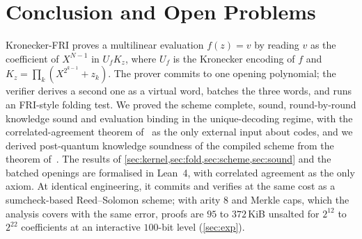 \section{Conclusion and Open Problems}\label{sec:concl}

Kronecker-FRI proves a multilinear evaluation $f(z) = v$ by reading $v$ as the coefficient of $X^{N-1}$ in $U_f K_z$, where $U_f$ is the Kronecker encoding of $f$ and $K_z = \prod_k (X^{2^{k-1}} + z_k)$.
The prover commits to one opening polynomial; the verifier derives a second one as a virtual word, batches the three words, and runs an FRI-style folding test.
We proved the scheme complete, sound, round-by-round knowledge sound and evaluation binding in the unique-decoding regime, with the correlated-agreement theorem of~\cite{BCIKS23} as the only external input about codes, and we derived post-quantum knowledge soundness of the compiled scheme from the theorem of~\cite{CDHZ25}. The results of \cref{sec:kernel,sec:fold,sec:scheme,sec:sound} and the batched openings are formalised in Lean~4, with correlated agreement as the only axiom.
At identical engineering, it commits and verifies at the same cost as a sumcheck-based Reed--Solomon scheme; with arity $8$ and Merkle caps, which the analysis covers with the same error, proofs are $95$ to $372$\,KiB unsalted for $2^{12}$ to $2^{22}$ coefficients at an interactive $100$-bit level (\cref{sec:exp}).

